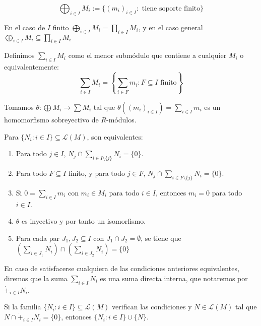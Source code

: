 \begin{df}
  \[
    \bigoplus_{i\in I} M_i:=\{{(m_i)}_{i\in I}: \textrm{ tiene soporte
    finito}\}
  \]
\end{df}


En el caso de \(I\) finito \(\bigoplus_{i\in I} M_i=\prod_{i\in I} M_i\),
y en el caso general \(\bigoplus_{i\in I} M_i\subseteq\prod_{i\in I} M_i\)

\begin{df}
  Definimos \(\sum_{i\in I} M_i\) como el menor submódulo que contiene
  a cualquier \(M_i\) o equivalentemente:
  \[
    \sum_{i\in I} M_i=\left\{\sum_{i\in F} m_i: F\subseteq I \textrm{ finito}\right\}
  \]
\end{df}

\begin{prop}
  Tomamos \(\theta:\bigoplus M_i\longrightarrow \sum M_i\) tal que
  \(\theta({(m_i)}_{i\in I})=\sum_{i\in I} m_i\) es un homomorfismo
  sobreyectivo de \(R\)-módulos.

  Para \(\{N_i:i\in I\}\subseteq\mathcal{L}(M)\), son equivalentes:
  \begin{enumerate}
    \item Para todo \(j\in I\), \(N_j\cap\sum_{i\in I\setminus\{j\}} N_i
      =\{0\}\).
    \item Para todo \(F\subseteq I\) finito, y para todo \(j\in F\),
      \(N_j\cap\sum_{i\in F\setminus\{j\}} N_i
      =\{0\}\).
    \item Si \(0=\sum_{i\in I} m_i\) con \(m_i\in M_i\) para todo
      \(i\in I\), entonces \(m_i=0\) para todo \(i\in I\).
    \item \(\theta\) es inyectivo y por tanto un isomorfismo.
    \item Para cada par \(J_1,J_2\subseteq I\) con
      \(J_1\cap J_2=\emptyset\), se tiene que
      \(\left(\sum_{i\in J_1} N_i\right)\cap
      \left(\sum_{i\in J_2} N_i\right)=\{0\}\)
  \end{enumerate}
\end{prop}

\begin{df}
  En caso de satisfacerse cualquiera de las condiciones anteriores
  equivalentes, diremos que la suma \(\sum_{i\in I} N_i\) es una suma
  directa interna, que notaremos por \(\dot{+}_{i\in I} N_i\).
\end{df}

\begin{cor}
  Si la familia \(\{N_i:i\in I\}\subseteq\mathcal{L}(M)\) verifican
  las condiciones y \(N\in\mathcal{L}(M)\) tal que
  \(N\cap\dot{+}_{i\in I} N_i=\{0\}\), entonces \(\{N_i:i\in I\}\cup\{N\}\).
\end{cor}

